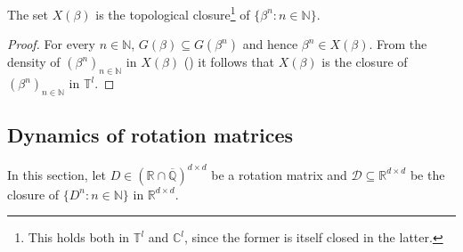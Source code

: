 \documentclass[a4paper,UKenglish,cleveref]{lipics-v2021}
\newcommand{\torus}{\mathbb{T}}
\newcommand{\nat}{\mathbb{N}}
\newcommand{\rel}{\mathbb{R}}
\newcommand{\rat}{\mathbb{Q}}
\newcommand{\com}{\mathbb{C}}
\newcommand{\alg}{\overline{\rat}}
\newcommand{\ralg}{\rel \cap \alg}
\newcommand{\Dcal}{\mathcal{D}}
\begin{document}
\begin{corollary}
	\label{thm:kronecker-closure}
	The set $X(\beta)$ is the topological closure\footnote{This holds both in $\torus^l$ and $\com^l$, since the former is itself closed in the latter.} of 
$\{\beta^n \colon n\in\nat\}$.
\end{corollary}
\begin{proof}
	For every $n\in\nat$, $G(\beta) \subseteq G(\beta^n)$ and hence $\beta^n \in X(\beta)$.
	From the density of $(\beta^n)_{n\in\nat}$ in $X(\beta)$ () it follows that $X(\beta)$ is the closure of $(\beta^n)_{n\in\nat}$ in $\torus^l$.
\end{proof}


\subsection{Dynamics of rotation matrices}
\label{sec:rotation}

In this section, let $D \in (\ralg)^{d\times d}$ be a rotation matrix and $\Dcal \subseteq \rel^{d\times d}$ be the closure of $\{D^n \colon n\in\nat\}$ in $\rel^{d\times d}$.
\end{document}
